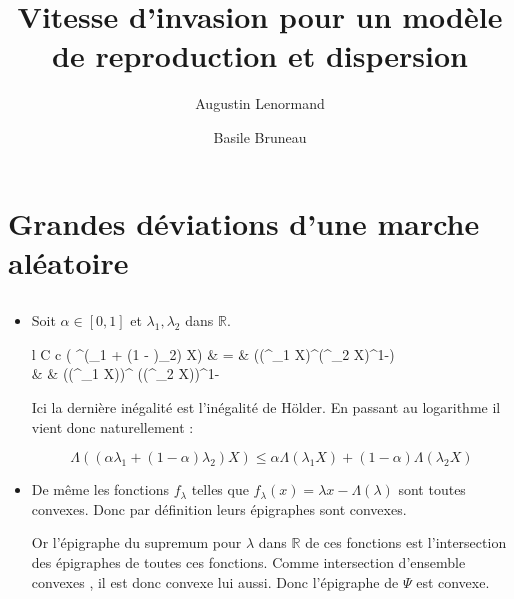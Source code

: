 \documentclass[12pt,titlepage=true]{article}
\title{Vitesse d'invasion pour un modèle de reproduction et dispersion}
\author{Augustin Lenormand \and Basile Bruneau}
\renewcommand\labelitemi{\textbullet}
\newcommand{\esp}{\mathbb{E}}
\renewcommand{\exp}{\mathrm{e}^}
\begin{document}
	\maketitle

	\section{Grandes déviations d'une marche aléatoire}
		\subsection{} %
			
			\renewcommand\labelitemi{\textbullet}
			
			\begin{itemize}
	
				\item	Soit $\alpha\in [0,1]$ et $\lambda_1, \lambda_2$ dans $\mathbb{R}$.
	
						\begin{IEEEeqnarray*}{l C c}
							\esp( \exp{(\alpha \lambda_1 + (1 - \alpha)\lambda_2) X}) &     =     &  \esp((\exp{\lambda_1 X})^{\alpha}(\exp{\lambda_2 X})^{1-\alpha})\\
																   					  & \leqslant & (\esp(\exp{\lambda_1 X}))^{\alpha} (\esp(\exp{\lambda_2 X}))^{1- \alpha}
						\end{IEEEeqnarray*}
	
	
						Ici la dernière inégalité est l'inégalité de Hölder. En passant au logarithme il vient donc naturellement :	
	
						\begin{equation*}
							\Lambda((\alpha \lambda_1 + (1 - \alpha)\lambda_2) X) \leqslant \alpha \Lambda(\lambda_1 X) + (1-\alpha) \Lambda(\lambda_2 X)
						\end{equation*}
		
		
				\item	De même les fonctions $f_\lambda$ telles que $f_\lambda (x)=\lambda x - \Lambda (\lambda)$ sont toutes convexes. Donc par définition leurs épigraphes sont convexes.
			
						Or l'épigraphe du supremum pour $\lambda$ dans $\mathbb{R}$ de ces fonctions est l'intersection des épigraphes de toutes ces fonctions. Comme intersection d'ensemble convexes , il est donc convexe lui aussi. Donc l'épigraphe de $\Psi$ est convexe.
		

\end{itemize}
\end{document}
